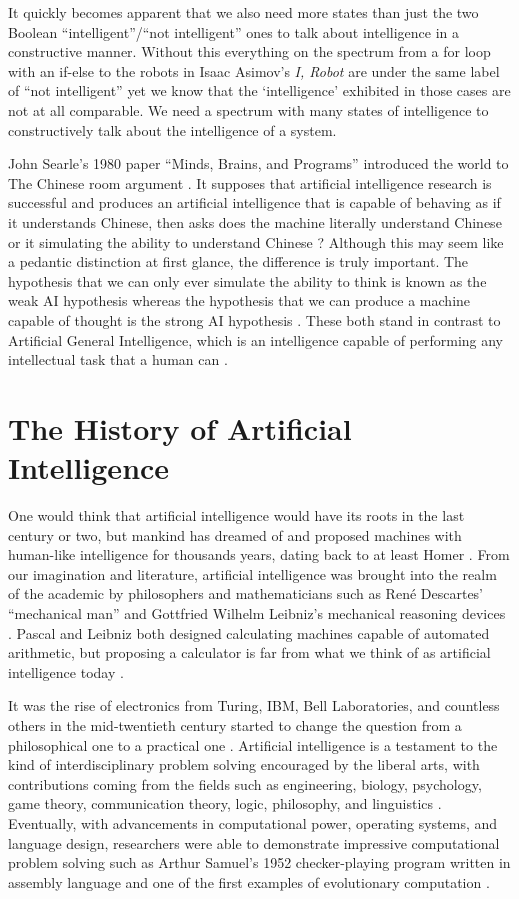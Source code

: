 \documentclass[oneside,12pt,openany]{book}
\begin{document}
	It quickly becomes apparent that we also need more states than just the two Boolean ``intelligent''/``not intelligent'' ones to talk about intelligence in a constructive manner. Without this everything on the spectrum from a for loop with an if-else to the robots in Isaac Asimov's \textit{I, Robot}  are under the same label of ``not intelligent'' yet we know that the `intelligence' exhibited in those cases are not at all comparable. We need a spectrum with many states of intelligence to constructively talk about the intelligence of a system.
	
	John Searle's 1980 paper ``Minds, Brains, and Programs'' introduced the world to The Chinese room argument \cite{Searle}. It supposes that artificial intelligence research is successful and produces an artificial intelligence that is capable of behaving as if it understands Chinese, then asks does the machine literally understand Chinese or it simulating the ability to understand Chinese \cite{Searle}? Although this may seem like a pedantic distinction at first glance, the difference is truly important. The hypothesis that we can only ever simulate the ability to think is known as the weak AI hypothesis whereas the hypothesis that we can produce a machine capable of thought is the strong AI hypothesis \cite{Jones}. These both stand in contrast to Artificial General Intelligence, which is an intelligence capable of performing any intellectual task that a human can \cite{Buchanan}.
	
	\section{The History of Artificial Intelligence}
	
	
	One would think that artificial intelligence would have its roots in the last century or two, but mankind has dreamed of and proposed machines with human-like intelligence for thousands years, dating back to at least Homer \cite{Buchanan}. From our imagination and literature, artificial intelligence was brought into the realm of the academic by philosophers and mathematicians such as Ren\'e Descartes' ``mechanical man'' and Gottfried Wilhelm Leibniz's mechanical reasoning devices \cite{Buchanan}. Pascal and Leibniz both designed calculating machines capable of automated arithmetic, but proposing a calculator is far from what we think of as artificial intelligence today  \cite{Buchanan}.
	
	It was the rise of electronics from Turing, IBM, Bell Laboratories, and countless others in the mid-twentieth century started to change the question from a philosophical one to a practical one \cite{Buchanan}. Artificial intelligence is a testament to the kind of interdisciplinary problem solving encouraged by the liberal arts, with contributions coming from the fields such as engineering, biology, psychology, game theory, communication theory, logic, philosophy, and linguistics \cite{Buchanan}. Eventually, with advancements in computational power, operating systems, and language design, researchers were able to demonstrate impressive  computational problem solving such as Arthur Samuel's 1952 checker-playing program written in assembly language and one of the first examples of evolutionary computation \cite{Buchanan}. 
	
\end{document}
